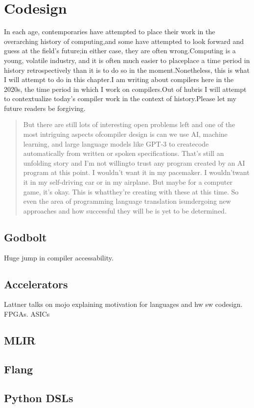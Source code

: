 \chapter{Codesign}
In each age, contemporaries have attempted to place their work in the 
overarching history of computing,and some have attempted to look forward and 
guess at the field's future;in either case, they are often wrong.Computing is a 
young, volatile industry, and it is often much easier to placeplace a time 
period in history retrospectively than it is to do so in the 
moment.Nonetheless, this is what I will attempt to do in this chapter.I am 
writing about compilers here in the 2020s, the time period in which I work on 
compilers.Out of hubris I will attempt to contextualize today's compiler work 
in the context of history.Please let my future readers be 
forgiving.\begin{quotation}
But there are still lots of interesting open problems left and one of the most 
intriguing aspects ofcompiler design is can we use AI, machine learning, and 
large language models like GPT-3 to createcode automatically from written or 
spoken specifications. That's still an unfolding story and I'm not willingto 
trust any program created by an AI program at this point. I wouldn't want it in 
my pacemaker. I wouldn'twant it in my self-driving car or in my airplane. But 
maybe for a computer game, it's okay. This is whatthey're creating with these 
at this time. So even the area of programming language translation isundergoing 
new approaches and how successful they will be is yet to be 
determined.\cite{aho_oral_history_2022}
\end{quotation}
\section{Godbolt}
Huge jump in compiler accessability\cite{godbolt_happy_birthday_ce_2022}.
\section{Accelerators}
Lattner talks on mojo explaining motivation for languages and hw sw codesign.
FPGAs. ASICs
\section{MLIR}
\section{Flang}
\section{Python DSLs}

